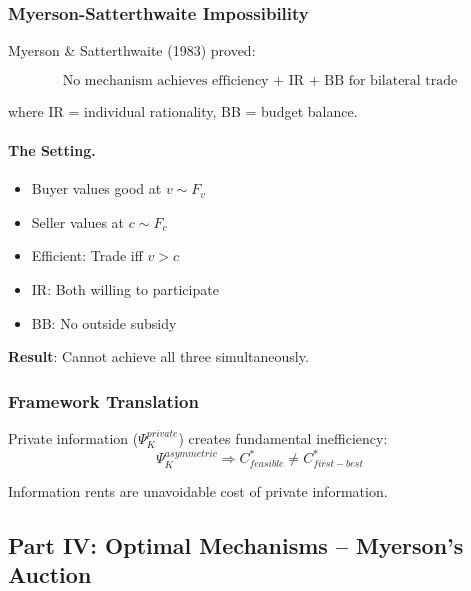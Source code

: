 \subsubsection{Myerson-Satterthwaite Impossibility}

Myerson \& Satterthwaite (1983) proved:

\begin{equation}
\boxed{
\text{No mechanism achieves efficiency + IR + BB for bilateral trade}
}
\label{eq:myerson-satterthwaite}
\end{equation}

where IR = individual rationality, BB = budget balance.

\paragraph{The Setting.}
\begin{itemize}
    \item Buyer values good at $v \sim F_v$
    \item Seller values at $c \sim F_c$
    \item Efficient: Trade iff $v > c$
    \item IR: Both willing to participate
    \item BB: No outside subsidy
\end{itemize}

\textbf{Result}: Cannot achieve all three simultaneously.

\subsubsection{Framework Translation}

Private information ($\Psi_K^{private}$) creates fundamental inefficiency:
\begin{equation}
\Psi_K^{asymmetric} \Rightarrow C^*_{feasible} \neq C^*_{first-best}
\end{equation}

Information rents are unavoidable cost of private information.

\subsection{Part IV: Optimal Mechanisms – Myerson's Auction}

